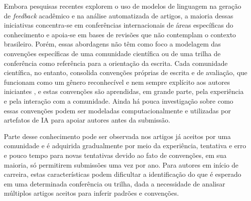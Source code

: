 Embora pesquisas recentes \cite{DeepReview,MARG,AgentReview,AgentLaboratory} explorem o uso de modelos de linguagem na geração de \textit{feedback} acadêmico e na análise automatizada de artigos, a maioria dessas iniciativas concentra-se em conferências internacionais de áreas específicas do conhecimento e apoia-se em bases de revisões que não contemplam o contexto brasileiro. Porém, essas abordagens não têm como foco a modelagem das convenções específicas de uma comunidade científica ou de uma trilha de conferência como referência para a orientação da escrita. Cada comunidade científica, no entanto, consolida convenções próprias de escrita e de avaliação, que funcionam como um gênero reconhecível e nem sempre explícito aos autores iniciantes \cite{GenresOrgComm}, e estas convenções são aprendidas, em grande parte, pela experiência e pela interação com a comunidade.  Ainda há pouca investigação sobre como essas convenções podem ser modeladas computacionalmente e utilizadas por artefatos de IA para apoiar autores antes da submissão.




Parte desse conhecimento pode ser observada nos artigos já aceitos por uma comunidade e é adquirida gradualmente por meio da experiência, tentativa e erro e pouco tempo para novas tentativas devido ao fato de convenções, em sua maioria, só permitirem submissões uma vez por ano. Para autores em início de carreira, estas características podem dificultar a identificação do que é esperado em uma determinada conferência ou trilha, dada a necessidade de analisar múltiplos artigos aceitos para inferir padrões e convenções.


